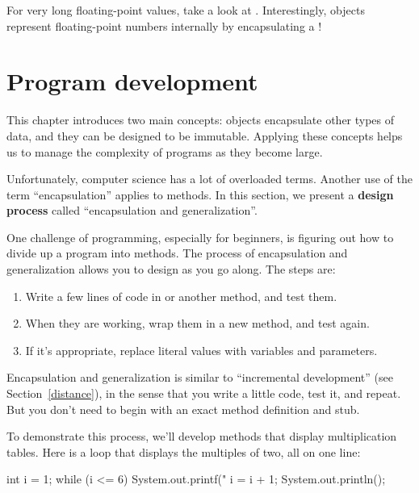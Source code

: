 For very long floating-point values, take a look at .
Interestingly,  objects represent floating-point numbers internally by encapsulating a !


\section{Program development}
\label{encapsulation}

This chapter introduces two main concepts: objects encapsulate other types of data, and they can be designed to be immutable.
Applying these concepts helps us to manage the complexity of programs as they become large.


Unfortunately, computer science has a lot of overloaded terms.
Another use of the term ``encapsulation'' applies to methods.
In this section, we present a {\bf design process} called ``encapsulation and generalization''.

One challenge of programming, especially for beginners, is figuring out how to divide up a program into methods.
The process of encapsulation and generalization allows you to design as you go along.
The steps are:

\begin{enumerate}
\item Write a few lines of code in  or another method, and test them.
\item When they are working, wrap them in a new method, and test again.
\item If it's appropriate, replace literal values with variables and parameters.
\end{enumerate}

Encapsulation and generalization is similar to ``incremental development'' (see Section~\ref{distance}), in the sense that you write a little code, test it, and repeat.
But you don't need to begin with an exact method definition and stub.


To demonstrate this process, we'll develop methods that display multiplication tables.
Here is a loop that displays the multiples of two, all on one line:

\begin{code}
int i = 1;
while (i <= 6) {
    System.out.printf("%
    i = i + 1;
}
System.out.println();
\end{code}

